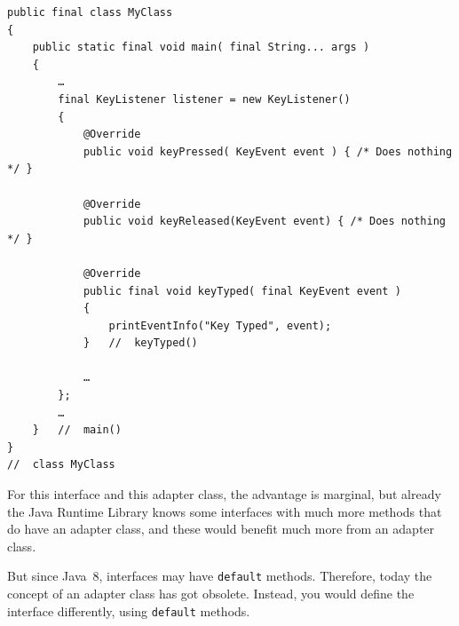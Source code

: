 \documentclass[11pt,a4paper, titlepage, parskip=half, headsepline, footsepline, cleardoublepage=current, headheight=1cm]{scrbook}
\begin{document}
\begin{lstlisting}
public final class MyClass 
{
    public static final void main( final String... args ) 
    {
        …
        final KeyListener listener = new KeyListener() 
        {
            @Override
            public void keyPressed( KeyEvent event ) { /* Does nothing */ }

            @Override
            public void keyReleased(KeyEvent event) { /* Does nothing */ }
            
            @Override
            public final void keyTyped( final KeyEvent event ) 
            {
                printEventInfo("Key Typed", event);
            }   //  keyTyped()
            
            …
        };
        …
    }   //  main()
}
//  class MyClass
\end{lstlisting}

For this interface and this adapter class, the advantage is marginal, but already the Java Runtime Library knows some interfaces with much more methods that do have an adapter class, and these would benefit much more from an adapter class.

But since Java~8, interfaces may have \lstinline|default| methods\autocite{ORACLE_TUTORIALS:DefaultMethods, ORACLE_DOC_LANGUAGE_SPECIFICATION:MethodDeclarationsInterface}. Therefore, today the concept of an adapter class has got obsolete. Instead, you would define the interface differently, using \lstinline|default| methods.
\end{document}
